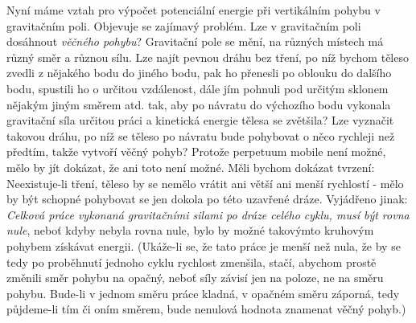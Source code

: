     Nyní máme vztah pro výpočet potenciální energie při vertikálním pohybu v gravitačním poli. 
    Objevuje se zajímavý problém. Lze v gravitačním poli dosáhnout \emph{věčného pohybu}? 
    Gravitační pole se mění, na různých místech má různý směr a různou sílu. Lze najít pevnou dráhu 
    bez tření, po níž bychom těleso zvedli z nějakého bodu do jiného bodu, pak ho přenesli po 
    oblouku do dalšího bodu, spustili ho o určitou vzdálenost, dále jím pohnuli pod určitým sklonem 
    nějakým jiným směrem atd. tak, aby po návratu do výchozího bodu vykonala gravitační síla 
    určitou práci a kinetická energie tělesa se zvětšila? Lze vyznačit takovou dráhu, po níž se 
    těleso po návratu bude pohybovat o něco rychleji než předtím, takže vytvoří věčný pohyb? 
    Protože perpetuum mobile není možné, mělo by jít dokázat, že ani toto není možné. Měli bychom 
    dokázat tvrzení: Neexistuje-li tření, těleso by se nemělo vrátit ani větší ani menší rychlostí 
    - mělo by být schopné pohybovat se jen dokola po této uzavřené dráze. Vyjádřeno jinak: 
    \emph{Celková práce vykonaná gravitačními silami po dráze celého cyklu, musí být rovna nule}, 
    neboť kdyby nebyla rovna nule, bylo by možné takovýmto kruhovým pohybem získávat energii. 
    (Ukáže-li se, že tato práce je menší než nula, že by se tedy po proběhnutí jednoho cyklu 
    rychlost zmenšila, stačí, abychom prostě změnili směr pohybu na opačný, neboť síly závisí jen 
    na poloze, ne na směru pohybu. Bude-li v jednom směru práce kladná, v opačném směru záporná, 
    tedy půjdeme-li tím či oním směrem, bude nenulová hodnota znamenat věčný pohyb.)
    

